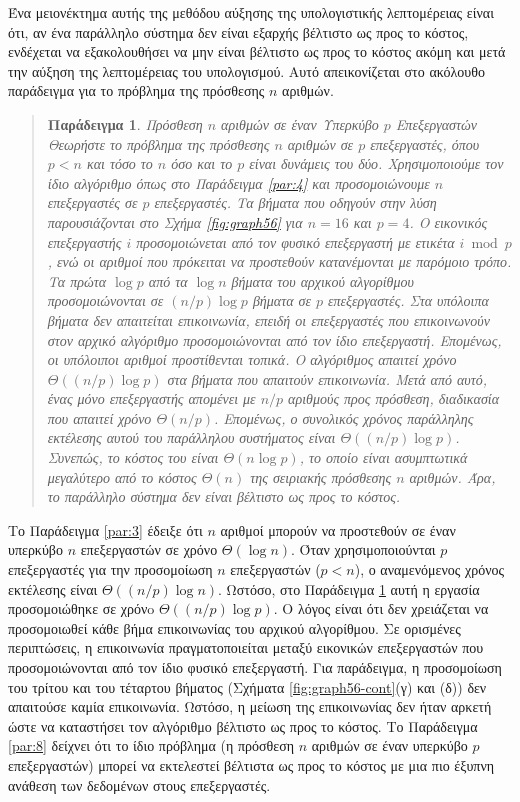\documentclass[12pt,a4paper]{article}
\newtheorem{paradeigma}{Παράδειγμα}
\begin{document}
Ένα μειονέκτημα αυτής της μεθόδου αύξησης της υπολογιστικής λεπτομέρειας 
είναι ότι, αν ένα παράλληλο σύστημα δεν είναι εξαρχής βέλτιστο ως προς το 
κόστος, ενδέχεται να εξακολουθήσει να μην είναι βέλτιστο ως προς το κόστος 
ακόμη και μετά την αύξηση της λεπτομέρειας του υπολογισμού. Αυτό απεικονίζεται 
στο ακόλουθο παράδειγμα για το πρόβλημα της πρόσθεσης $n$ αριθμών.

\begin{quote}
\begin{paradeigma} \label{par:7} Πρόσθεση $n$ αριθμών σε έναν Υπερκύβο $p$ Επεξεργαστών
Θεωρήστε το πρόβλημα της πρόσθεσης $n$ αριθμών σε $p$ επεξεργαστές, όπου 
$p < n$ και τόσο το $n$ όσο και το $p$ είναι δυνάμεις του δύο. Χρησιμοποιούμε 
τον ίδιο αλγόριθμο όπως στο Παράδειγμα \ref{par:4} και προσομοιώνουμε $n$ 
επεξεργαστές σε $p$ επεξεργαστές. Τα βήματα που οδηγούν στην λύση παρουσιάζονται 
στο Σχήμα \ref{fig:graph56} για $n=16$ και $p=4$. Ο εικονικός επεξεργαστής 
$i$ προσομοιώνεται από τον φυσικό επεξεργαστή με ετικέτα $i \bmod p$, ενώ 
οι αριθμοί που πρόκειται να προστεθούν κατανέμονται με παρόμοιο τρόπο. Τα 
πρώτα $\log p$ από τα $\log n$ βήματα του αρχικού αλγορίθμου προσομοιώνονται 
σε $(n/p)\log p$ βήματα σε $p$ επεξεργαστές. Στα υπόλοιπα βήματα δεν 
απαιτείται επικοινωνία, επειδή οι επεξεργαστές που επικοινωνούν στον αρχικό 
αλγόριθμο προσομοιώνονται από τον ίδιο επεξεργαστή. Επομένως, οι υπόλοιποι 
αριθμοί προστίθενται τοπικά. Ο αλγόριθμος απαιτεί χρόνο $\Theta((n/p)\log p)$ 
στα βήματα που απαιτούν επικοινωνία. Μετά από αυτό, ένας μόνο επεξεργαστής 
απομένει με $n/p$ αριθμούς προς πρόσθεση, διαδικασία που απαιτεί χρόνο 
$\Theta(n/p)$. Επομένως, ο συνολικός χρόνος παράλληλης εκτέλεσης αυτού του 
παράλληλου συστήματος είναι $\Theta((n/p)\log p)$. Συνεπώς, το κόστος του 
είναι $\Theta(n\log p)$, το οποίο είναι ασυμπτωτικά μεγαλύτερο από το κόστος 
$\Theta(n)$ της σειριακής πρόσθεσης $n$ αριθμών. Άρα, το παράλληλο σύστημα 
δεν είναι βέλτιστο ως προς το κόστος.
\end{paradeigma}
\end{quote}

Το Παράδειγμα \ref{par:3} έδειξε ότι $n$ αριθμοί μπορούν να προστεθούν σε 
έναν υπερκύβο $n$ επεξεργαστών σε χρόνο $\Theta(\log n)$. Όταν χρησιμοποιούνται 
$p$ επεξεργαστές για την προσομοίωση $n$ επεξεργαστών ($p<n$), ο αναμενόμενος 
χρόνος εκτέλεσης είναι $\Theta((n/p)\log n)$. Ωστόσο, στο Παράδειγμα \ref{par:7} 
αυτή η εργασία προσομοιώθηκε σε χρόνo $\Theta((n/p)\log p)$. Ο λόγος είναι 
ότι δεν χρειάζεται να προσομοιωθεί κάθε βήμα επικοινωνίας του αρχικού 
αλγορίθμου. Σε ορισμένες περιπτώσεις, η επικοινωνία πραγματοποιείται μεταξύ 
εικονικών επεξεργαστών που προσομοιώνονται από τον ίδιο φυσικό επεξεργαστή. 
Για παράδειγμα, η προσομοίωση του τρίτου και του τέταρτου βήματος {(}Σχήματα 
\ref{fig:graph56-cont}(γ) και (δ){)} δεν απαιτούσε καμία επικοινωνία.
Ωστόσο, η μείωση της επικοινωνίας δεν ήταν αρκετή ώστε να καταστήσει τον 
αλγόριθμο βέλτιστο ως προς το κόστος. Το Παράδειγμα \ref{par:8} δείχνει 
ότι το ίδιο πρόβλημα (η πρόσθεση $n$ αριθμών σε έναν υπερκύβο $p$ επεξεργαστών) 
μπορεί να εκτελεστεί βέλτιστα ως προς το κόστος με μια πιο έξυπνη ανάθεση 
των δεδομένων στους επεξεργαστές.
\end{document}
